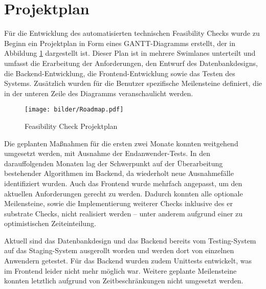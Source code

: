 \section{Projektplan}
Für die Entwicklung des automatisierten technischen Feasibility Checks wurde zu Beginn ein Projektplan in Form eines GANTT-Diagramms erstellt, der in Abbildung \ref{fig:roadmap} dargestellt ist. Dieser Plan ist in mehrere Swimlanes unterteilt und umfasst die Erarbeitung der Anforderungen, den Entwurf des Datenbankdesigns, die Backend-Entwicklung, die Frontend-Entwicklung sowie das Testen des Systems. Zusätzlich wurden für die Benutzer spezifische Meilensteine definiert, die in der unteren Zeile des Diagramms veranschaulicht werden.

\begin{figure}[!htbp]
    \centering
    \texttt{[image: bilder/Roadmap.pdf]}
    \caption{Feasibility Check Projektplan}
    \label{fig:roadmap}
\end{figure}

Die geplanten Maßnahmen für die ersten zwei Monate konnten weitgehend umgesetzt werden, mit Ausnahme der Endanwender-Tests. In den darauffolgenden Monaten lag der Schwerpunkt auf der Überarbeitung bestehender Algorithmen im Backend, da wiederholt neue Ausnahmefälle identifiziert wurden. Auch das Frontend wurde mehrfach angepasst, um den aktuellen Anforderungen gerecht zu werden. Dadurch konnten alle optionale Meilensteine, sowie die Implementierung weiterer Checks inklusive des er \gls{substrate} Checks, nicht realisiert werden – unter anderem aufgrund einer zu optimistischen Zeiteinteilung.

Aktuell sind das Datenbankdesign und das Backend bereits vom Testing-System auf das Staging-System ausgerollt worden und werden dort von einzelnen Anwendern getestet. Für das Backend wurden zudem Unittests entwickelt, was im Frontend leider nicht mehr möglich war. Weitere geplante Meilensteine konnten letztlich aufgrund von Zeitbeschränkungen nicht umgesetzt werden.